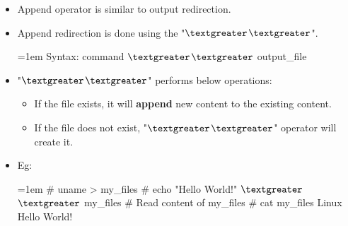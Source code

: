 \setlength{\columnsep}{3pt}
\begin{flushleft}
	\begin{itemize}
		\item Append operator is similar to output redirection.
		\item Append redirection is done using the "\textbf{{$\textgreater$}}\textbf{{$\textgreater$}}".
		\bigskip
		\begin{tcolorbox}[breakable,notitle,boxrule=-0pt,colback=pink,colframe=pink]
			\color{black}
			\font=1em
			Syntax: command \textbf{{$\textgreater$}}\textbf{{$\textgreater$}} output\_file
			\font=4pt
		\end{tcolorbox}
	
		\item "\textbf{{$\textgreater$}}\textbf{{$\textgreater$}}" performs below operations:
		\begin{itemize}
			\item If the file exists, it will \textbf{append} new content to the existing content.
			\item If the file does not exist, "\textbf{{$\textgreater$}}\textbf{{$\textgreater$}}" operator will create it.
		\end{itemize}
	
		\item 	Eg:
		\begin{tcolorbox}[breakable,notitle,boxrule=-0pt,colback=black,colframe=black]
			\color{green}
			\font=1em
			\# uname > my\_files 
			\newline
			\# echo "Hello World!" \textbf{{$\textgreater$}}\textbf{{$\textgreater$}} my\_files 			
			\newline
			\newline
			\color{yellow}
			\# Read content of my\_files
			\color{green}
			\newline
			\# cat my\_files    
			\newline
			\color{white}
			Linux 
			\newline
			\color{white}
			Hello World!
			\font=4pt
		\end{tcolorbox}
		
		
	\end{itemize}

	
\end{flushleft}

\newpage

